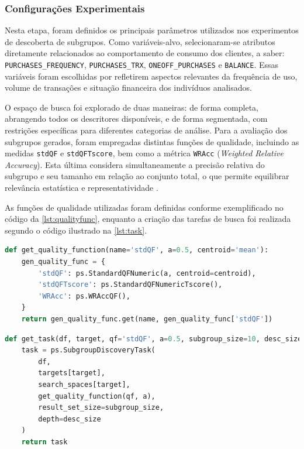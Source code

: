 \documentclass[12pt]{article}
\begin{document}
\subsubsection{Configurações Experimentais}

Nesta etapa, foram definidos os principais parâmetros utilizados nos experimentos de descoberta de subgrupos. Como variáveis-alvo, selecionaram-se atributos diretamente relacionados ao comportamento de consumo dos clientes, a saber: \texttt{PURCHASES\_FREQUENCY}, \texttt{PURCHASES\_TRX}, \texttt{ONEOFF\_PURCHASES} e \texttt{BALANCE}. Essas variáveis foram escolhidas por refletirem aspectos relevantes da frequência de uso, volume de transações e situação financeira dos indivíduos analisados.

O espaço de busca foi explorado de duas maneiras: de forma completa, abrangendo todos os descritores disponíveis, e de forma segmentada, com restrições específicas para diferentes categorias de análise. Para a avaliação dos subgrupos gerados, foram empregadas distintas funções de qualidade, incluindo as medidas \texttt{stdQF} e \texttt{stdQFTscore}, bem como a métrica \texttt{WRAcc} (\textit{Weighted Relative Accuracy}). Esta última considera simultaneamente a precisão relativa do subgrupo e seu tamanho em relação ao conjunto total, o que permite equilibrar relevância estatística e representatividade \cite{vimieiro:24}.

As funções de qualidade utilizadas foram definidas conforme exemplificado no código da \autoref{lst:qualityfunc}, enquanto a criação das tarefas de busca foi realizada segundo o código ilustrado na \autoref{lst:task}.

\begin{lstlisting}[language=Python, caption={Função auxiliar para seleção da métrica de qualidade utilizada em cada experimento.}, label={lst:qualityfunc}]
def get_quality_function(name='stdQF', a=0.5, centroid='mean'):
    gen_quality_func = {
        'stdQF': ps.StandardQFNumeric(a, centroid=centroid),
        'stdQFTscore': ps.StandardQFNumericTscore(),
        'WRAcc': ps.WRAccQF(),
    }
    return gen_quality_func.get(name, gen_quality_func['stdQF'])
\end{lstlisting}

\begin{lstlisting}[language=Python, caption={Criação da tarefa de descoberta de subgrupos}]
def get_task(df, target, qf='stdQF', a=0.5, subgroup_size=10, desc_size=3):
    task = ps.SubgroupDiscoveryTask(
        df,
        targets[target],
        search_spaces[target],
        get_quality_function(qf, a),
        result_set_size=subgroup_size,
        depth=desc_size
    )
    return task
\end{lstlisting}
\end{document}
